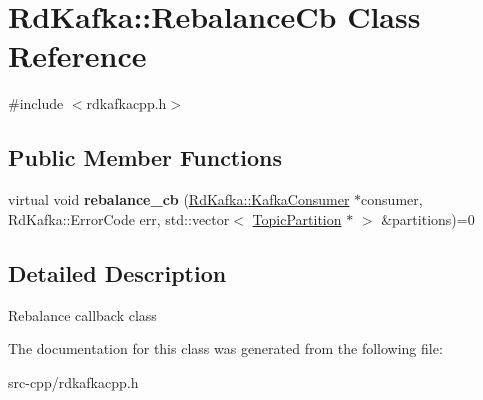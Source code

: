 \hypertarget{classRdKafka_1_1RebalanceCb}{\section{Rd\-Kafka\-:\-:Rebalance\-Cb Class Reference}
\label{classRdKafka_1_1RebalanceCb}
}


{\ttfamily \#include $<$rdkafkacpp.\-h$>$}

\subsection*{Public Member Functions}
\begin{DoxyCompactItemize}
\item 
\hypertarget{classRdKafka_1_1RebalanceCb_a490a91c52724382a72380af621958741}{virtual void {\bfseries rebalance\-\_\-cb} (\hyperlink{classRdKafka_1_1KafkaConsumer}{Rd\-Kafka\-::\-Kafka\-Consumer} $\ast$consumer, Rd\-Kafka\-::\-Error\-Code err, std\-::vector$<$ \hyperlink{classRdKafka_1_1TopicPartition}{Topic\-Partition} $\ast$ $>$ \&partitions)=0}\label{classRdKafka_1_1RebalanceCb_a490a91c52724382a72380af621958741}

\end{DoxyCompactItemize}


\subsection{Detailed Description}
Rebalance callback class 

The documentation for this class was generated from the following file\-:\begin{DoxyCompactItemize}
\item 
src-\/cpp/rdkafkacpp.\-h\end{DoxyCompactItemize}
